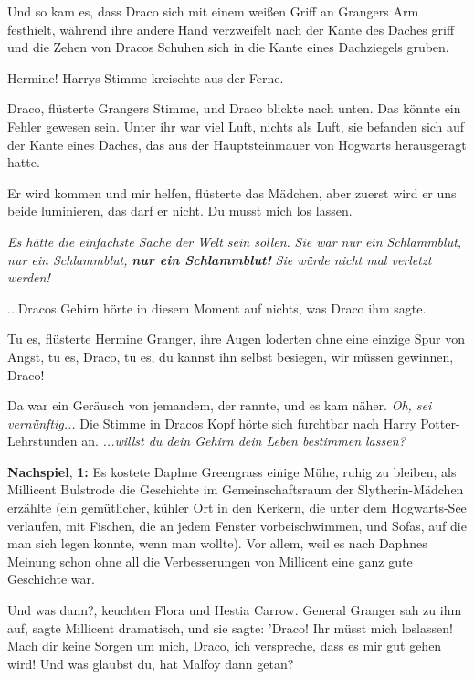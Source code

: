 Und so kam es, dass Draco sich mit einem weißen Griff an Grangers Arm festhielt,
während ihre andere Hand verzweifelt nach der Kante des Daches griff und die
Zehen von Dracos Schuhen sich in die Kante eines Dachziegels gruben.

\glqq{}Hermine!\grqq{} Harrys Stimme kreischte aus der Ferne.

\glqq{}Draco\grqq{}, flüsterte Grangers Stimme, und Draco blickte nach unten. Das
könnte ein Fehler gewesen sein. Unter ihr war viel Luft, nichts als Luft, sie
befanden sich auf der Kante eines Daches, das aus der Hauptsteinmauer von
Hogwarts herausgeragt hatte.

\glqq{}Er wird kommen und mir helfen\grqq{}, flüsterte das Mädchen, \glqq{}aber
zuerst wird er uns beide luminieren, das darf er nicht. Du musst mich los
lassen.\grqq{}

\emph{Es hätte die einfachste Sache der Welt sein sollen.}
\emph{Sie war nur ein Schlammblut, nur ein Schlammblut,} \textbf{\emph{nur ein
Schlammblut!}}\emph{ Sie würde nicht mal verletzt werden!}

...Dracos Gehirn hörte in diesem Moment auf nichts, was Draco ihm sagte.

\glqq{}Tu es\grqq{}, flüsterte Hermine Granger, ihre Augen loderten ohne eine
einzige Spur von Angst, \glqq{}tu es, Draco, tu es, du kannst ihn selbst
besiegen, wir müssen gewinnen, Draco!\grqq{}

Da war ein Geräusch von jemandem, der rannte, und es kam näher. \emph{ Oh, sei
vernünftig...} Die Stimme in Dracos Kopf hörte sich furchtbar nach Harry
Potter-Lehrstunden an.
\emph{...willst du dein Gehirn dein Leben bestimmen lassen?}

\textbf{Nachspiel}, \textbf{1:} Es kostete Daphne Greengrass einige Mühe, ruhig
zu bleiben, als Millicent Bulstrode die Geschichte im Gemeinschaftsraum der
Slytherin-Mädchen erzählte (ein gemütlicher, kühler Ort in den Kerkern, die
unter dem Hogwarts-See verlaufen, mit Fischen, die an jedem Fenster
vorbeischwimmen, und Sofas, auf die man sich legen konnte, wenn man wollte). Vor
allem, weil es nach Daphnes Meinung schon ohne all die Verbesserungen von
Millicent eine ganz gute Geschichte war.

\glqq{}Und was dann?\grqq{}, keuchten Flora und Hestia Carrow. \glqq{}General
Granger sah zu ihm auf\grqq{}, sagte Millicent dramatisch, \glqq{}und sie sagte:
'Draco! Ihr müsst mich loslassen! Mach dir keine Sorgen um mich, Draco, ich
verspreche, dass es mir gut gehen wird! Und was glaubst du, hat Malfoy dann
getan?\grqq{}

